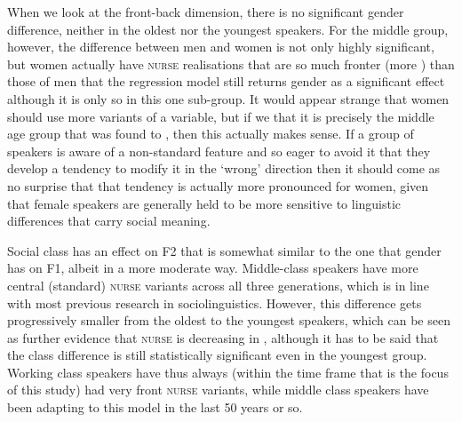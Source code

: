 When we look at the front-back dimension, there is no significant gender difference, neither in the oldest nor the youngest speakers.
For the middle group, however, the difference between men and women is not only highly significant, but women actually have \textsc{nurse} realisations that are so much fronter (more ) than those of men that the regression model still returns gender as a significant effect although it is only so in this one sub-group.
It would appear strange that women should use more  variants of a  variable, but if we  that it is precisely the middle age group that was found to , then this actually makes sense.
If a group of speakers is aware of a non-standard feature and so eager to avoid it that they develop a tendency to modify it in the `wrong' direction then it should come as no surprise that that tendency is actually more pronounced for women, given that female speakers are generally held to be more sensitive to linguistic differences that carry social meaning.

Social class has an effect on F2 that is somewhat similar to the one that gender has on F1, albeit in a more moderate way.
Middle-class speakers have more central (standard) \textsc{nurse} variants across all three generations, which is in line with most previous research in sociolinguistics.
However, this difference gets progressively smaller from the oldest to the youngest speakers, which can be seen as further evidence that \textsc{nurse} is decreasing in , although it has to be said that the class difference is still statistically significant even in the youngest group.
Working class speakers have thus always (within the time frame that is the focus of this study) had very front \textsc{nurse} variants, while middle class speakers have been adapting to this model in the last 50 years or so.

